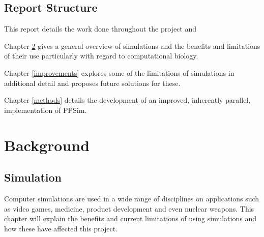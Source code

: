 \documentclass{UoYCSproject}
\begin{document}
\section{Report Structure}
This report details the work done throughout the project and 

Chapter \ref{background} gives a general overview of simulations and the benefits and limitations of their use particularly with regard to computational biology.

Chapter \ref{improvements} explores some of the limitations of simulations in additional detail and proposes future solutions for these.

Chapter \ref{methods} details the development of an improved, inherently parallel, implementation of PPSim.


\chapter{Background}
\label{background}
%

\section{Simulation}


Computer simulations are used in a wide range of disciplines on applications such as video games, medicine, product development and even nuclear weapons. This chapter will explain the benefits and current limitations of using simulations and how these have affected this project.
\end{document}
